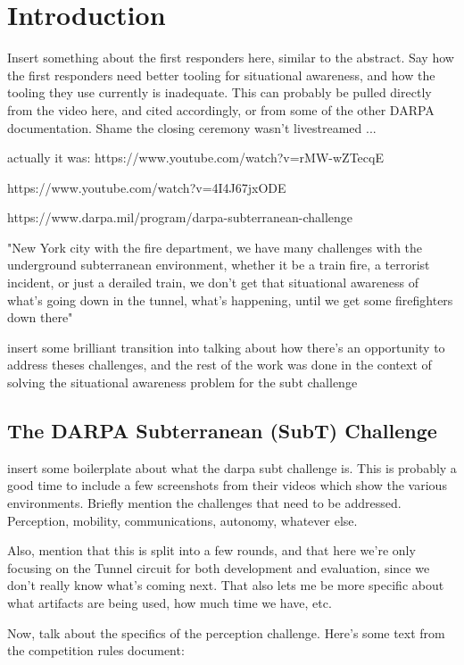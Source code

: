 \chapter{Introduction}

Insert something about the first responders here, similar to the abstract. Say how the first responders need better tooling for situational awareness, and how the tooling they use currently is inadequate. This can probably be pulled directly from the video here, and cited accordingly, or from some of the other DARPA documentation. Shame the closing ceremony wasn't livestreamed ...

actually it was: https://www.youtube.com/watch?v=rMW-wZTecqE

https://www.youtube.com/watch?v=4I4J67jxODE

https://www.darpa.mil/program/darpa-subterranean-challenge

"New York city with the fire department, we have many challenges with the underground subterranean environment, whether it be a train fire, a terrorist incident, or just a derailed train, we don't get that situational awareness of what's going down in the tunnel, what's happening, until we get some firefighters down there"

insert some brilliant transition into talking about how there's an opportunity to address theses challenges, and the rest of the work was done in the context of solving the situational awareness problem for the subt challenge

\section{The DARPA Subterranean (SubT) Challenge}

insert some boilerplate about what the darpa subt challenge is. This is probably a good time to include a few screenshots from their videos which show the various environments. Briefly mention the challenges that need to be addressed. Perception, mobility, communications, autonomy, whatever else.

Also, mention that this is split into a few rounds, and that here we're only focusing on the Tunnel circuit for both development and evaluation, since we don't really know what's coming next. That also lets me be more specific about what artifacts are being used, how much time we have, etc.

Now, talk about the specifics of the perception challenge. Here's some text from the competition rules document:

